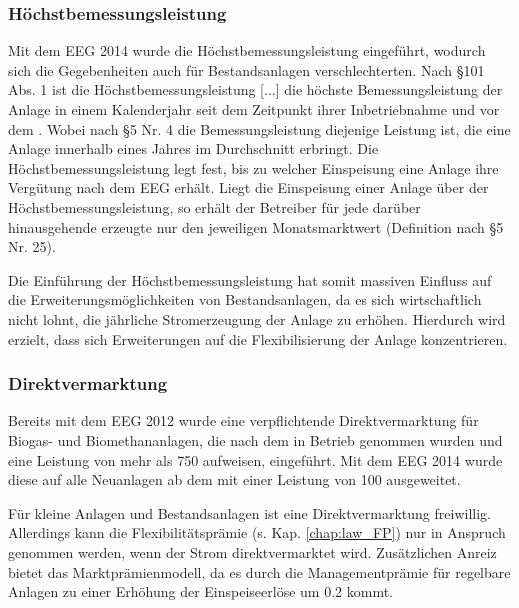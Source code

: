 \subsubsection{Höchstbemessungsleistung}\label{chap:law_Bem}

Mit dem \gls{EEG} \SI{2014}{\relax} wurde die Höchstbemessungsleistung eingeführt, wodurch sich die Gegebenheiten auch für Bestandsanlagen verschlechterten. Nach \S 101 Abs. 1 ist die \glqq Höchstbemessungsleistung [...] die höchste Bemessungsleistung der Anlage in einem Kalenderjahr seit dem Zeitpunkt ihrer Inbetriebnahme und vor dem .\grqq{} Wobei nach \S 5 Nr. 4 die Bemessungsleistung diejenige Leistung ist, die eine Anlage innerhalb eines Jahres im Durchschnitt erbringt. \parencite{BJV2014a} Die Höchstbemessungsleistung legt fest, bis zu welcher Einspeisung eine Anlage ihre Vergütung nach dem \gls{EEG} erhält. Liegt die Einspeisung einer Anlage über der Höchstbemessungsleistung, so erhält der Betreiber für jede darüber hinausgehende erzeugte \si{\kwh} nur den jeweiligen Monatsmarktwert (Definition nach \S 5 Nr. 25). \parencite{Loibl2014}\smallskip

Die Einführung der Höchstbemessungsleistung hat somit massiven Einfluss auf die Erweiterungsmöglichkeiten von Bestandsanlagen, da es sich wirtschaftlich nicht lohnt, die jährliche Stromerzeugung der Anlage zu erhöhen. Hierdurch wird erzielt, dass sich Erweiterungen auf die Flexibilisierung der Anlage konzentrieren. \parencite{DanielGromke2019}


\subsubsection{Direktvermarktung}\label{chap:law_DV}

Bereits mit dem \gls{EEG} \SI{2012}{\relax} wurde eine verpflichtende Direktvermarktung für Biogas- und Biomethananlagen, die nach dem  in Betrieb genommen wurden und eine Leistung von mehr als \SI{750}{\kw} aufweisen, eingeführt. Mit dem \gls{EEG} \SI{2014}{\relax} wurde diese auf alle Neuanlagen ab dem  mit einer Leistung von \SI{100}{\kw} ausgeweitet.\smallskip

Für kleine Anlagen und Bestandsanlagen ist eine Direktvermarktung freiwillig. Allerdings kann die Flexibilitätsprämie (s. Kap. \ref{chap:law_FP}) nur in Anspruch genommen werden, wenn der Strom direktvermarktet wird. Zusätzlichen Anreiz bietet das Marktprämienmodell, da es durch die Managementprämie für regelbare Anlagen zu einer Erhöhung der Einspeiseerlöse um \SI{0.2}{\ctkwh} kommt.\smallskip


